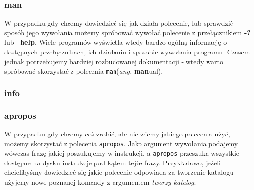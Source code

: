 \subsubsection{man}
W przypadku gdy chcemy dowiedzieć się jak działa polecenie, lub sprawdzić sposób jego wywołania możemy spróbować wywołać polecenie z przełącznikiem \textbf{-?} lub \textbf{--help}. Wiele programów wyświetla wtedy bardzo ogólną informację o dostępnych przełącznikach, ich działaniu i sposobie wywołania programu. Czasem jednak potrzebujemy bardziej rozbudowanej dokumentacji - wtedy warto spróbować skorzystać z polecenia \texttt{man}(\textit{ang.} \textbf{man}ual).

\subsubsection{info}

\subsubsection{apropos}
W przypadku gdy chcemy coś zrobić, ale nie wiemy jakiego polecenia użyć, możemy skorzystać z polecenia \texttt{apropos}. Jako argument wywołania podajemy wówczas frazę jakiej poszukujemy w instrukcji, a \texttt{apropos} przeszuka wszystkie dostępne na dysku instrukcje pod kątem tejże frazy. Przykładowo, jeżeli chcielibyśmy dowiedzieć się jakie polecenie odpowiada za tworzenie katalogu  użyjemy nowo poznanej komendy z argumentem \textit{tworzy katalog}:
\newline

